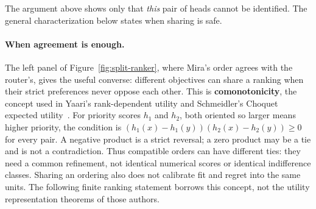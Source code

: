 \documentclass[11pt,a4paper]{article}
\theoremstyle{definition}
\theoremstyle{plain}
\begin{document}
The argument above shows only that \emph{this} pair of heads cannot be
identified. The general characterization below states when sharing is safe.

\paragraph{When agreement is enough.}
The left panel of Figure~\ref{fig:split-ranker}, where Mira's order agrees with
the router's, gives the useful converse: different objectives can share a
ranking when their strict preferences never oppose each other. This is
\textbf{comonotonicity}, the concept used in Yaari's rank-dependent utility
and Schmeidler's Choquet expected utility~.
For priority scores $h_1$ and $h_2$, both oriented so larger means higher
priority, the condition is
$(h_1(x)-h_1(y))(h_2(x)-h_2(y))\geq 0$ for every pair. A negative product is a
strict reversal; a zero product may be a tie and is not a contradiction.
Thus compatible orders can have different ties: they need a common
refinement, not identical numerical scores or identical indifference
classes. Sharing an ordering also does not calibrate fit and regret into
the same units. The following finite ranking statement borrows this
concept, not the utility representation theorems of those authors.
\end{document}
